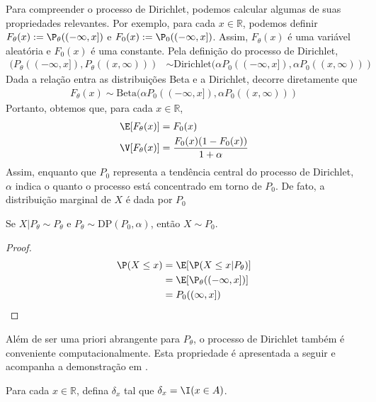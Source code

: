 Para compreender o processo de Dirichlet,
podemos calcular algumas
de suas propriedades relevantes.
Por exemplo, para cada $x \in \mathbb{R}$,
podemos definir $F_{\theta}(x) 
:= \P_{\theta}((-\infty,x])$ e
$F_0(x) := \P_0((-\infty,x])$. Assim,
$F_{\theta}(x)$ é uma variável aleatória e
$F_0(x)$ é uma constante.
Pela definição do processo de Dirichlet,
\begin{align*}
 (P_{\theta}((-\infty,x]),P_{\theta}((x,\infty)))
 &\sim \text{Dirichlet}(\alpha P_0((-\infty,x]),
 \alpha P_0((x,\infty)))
\end{align*}
Dada a relação entra as distribuições Beta e
a Dirichlet, decorre diretamente que
\begin{align*}
 F_{\theta}(x) \sim \text{Beta}
(\alpha P_0((-\infty,x]), \alpha P_0((x,\infty)))
\end{align*}
Portanto, obtemos que,
para cada $x \in \mathbb{R}$,
\begin{align*}
 \E[F_{\theta}(x)] 
 &= F_0(x) \\
 \V[F_{\theta}(x)] 
 &= \frac{F_0(x)(1-F_0(x))}{1+\alpha}
\end{align*}
Assim, enquanto que
$P_0$ representa a tendência central
do processo de Dirichlet, 
$\alpha$ indica o quanto o processo
está concentrado em torno de $P_0$.
De fato, a distribuição marginal de $X$
é dada por $P_0$

\begin{lemma}
 \label{lemma:dp-marginal}
 Se $X|P_{\theta} \sim P_{\theta}$ e
 $P_{\theta} \sim \text{DP}(P_0, \alpha)$, então
 $X \sim P_0$.
\end{lemma}

\begin{proof}
 \begin{align*}
  \P(X \leq x) 
  &= \E[\P(X \leq x|P_{\theta})] \\
  &= \E[\P_{\theta}((-\infty,x])] \\
  &= P_0((\infty,x])
 \end{align*}
\end{proof}

Além de ser uma priori abrangente para $P_{\theta}$,
o processo de Dirichlet também é
conveniente computacionalmente.
Esta propriedade é apresentada a seguir e
acompanha a demonstração em
\citep{Ferguson1973}.

\begin{definition}
 \label{defn:dirac}
 Para cada $x \in \mathbb{R}$,
 defina $\delta_x$ tal que
 $\delta_x = \I(x \in A)$.
\end{definition}

